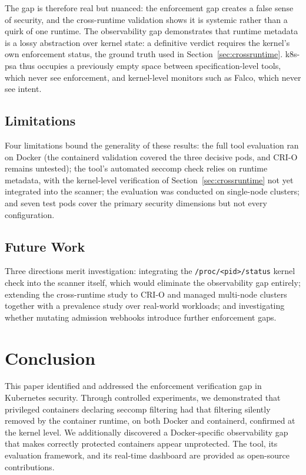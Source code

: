 \documentclass[conference]{IEEEtran}
\begin{document}
The gap is therefore real but nuanced: the enforcement gap creates a false sense of security, and the cross-runtime validation shows it is systemic rather than a quirk of one runtime. The observability gap demonstrates that runtime metadata is a lossy abstraction over kernel state: a definitive verdict requires the kernel's own enforcement status, the ground truth used in Section~\ref{sec:crossruntime}. k8s-psa thus occupies a previously empty space between specification-level tools, which never see enforcement, and kernel-level monitors such as Falco, which never see intent.

\subsection{Limitations}

Four limitations bound the generality of these results: the full tool evaluation ran on Docker (the containerd validation covered the three decisive pods, and CRI-O remains untested); the tool's automated seccomp check relies on runtime metadata, with the kernel-level verification of Section~\ref{sec:crossruntime} not yet integrated into the scanner; the evaluation was conducted on single-node clusters; and seven test pods cover the primary security dimensions but not every configuration.

\subsection{Future Work}

Three directions merit investigation: integrating the \texttt{/proc/<pid>/status} kernel check into the scanner itself, which would eliminate the observability gap entirely; extending the cross-runtime study to CRI-O and managed multi-node clusters together with a prevalence study over real-world workloads; and investigating whether mutating admission webhooks introduce further enforcement gaps.

\section{Conclusion}

This paper identified and addressed the enforcement verification gap in Kubernetes security. Through controlled experiments, we demonstrated that privileged containers declaring seccomp filtering had that filtering silently removed by the container runtime, on both Docker and containerd, confirmed at the kernel level. We additionally discovered a Docker-specific observability gap that makes correctly protected containers appear unprotected. The tool, its evaluation framework, and its real-time dashboard are provided as open-source contributions.
\end{document}
